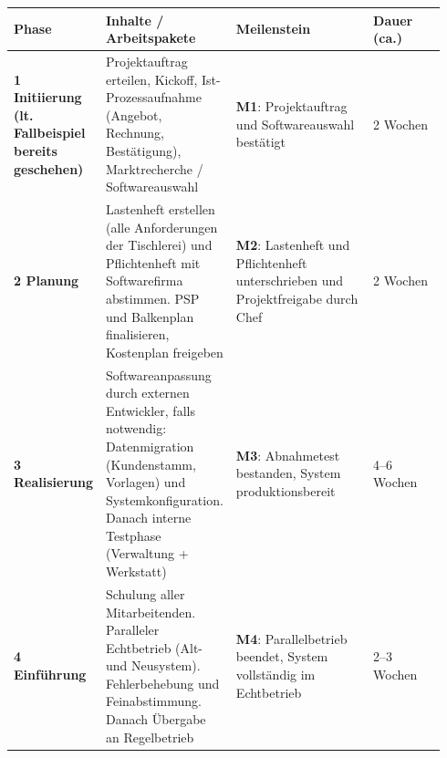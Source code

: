 \documentclass[
    a4paper,
    11pt,
    bibliography=totoc,
    listof=totoc,
    parskip=half,
    headings=normal
]{scrbook}
\begin{document}
\begin{longtable}{@{}p{0.15\linewidth}p{0.30\linewidth}p{0.32\linewidth}p{0.17\linewidth}@{}}
      \toprule
      \textbf{Phase} & \textbf{Inhalte / Arbeitspakete}                                                                                                                                                & \textbf{Meilenstein} & \textbf{Dauer (ca.)} \\
      \midrule
      \endhead
      \textbf{1 Initiierung (lt. Fallbeispiel bereits geschehen)}
                     & Projektauftrag erteilen, Kickoff, Ist-Prozessaufnahme (Angebot, Rechnung, Bestätigung), Marktrecherche / Softwareauswahl
                     & \textbf{M1}: Projektauftrag und Softwareauswahl bestätigt
                     & 2 Wochen                                                                                                                                                                                                                      \\
      \midrule
      \textbf{2 Planung}
                     & Lastenheft erstellen (alle Anforderungen der Tischlerei) und Pflichtenheft mit Softwarefirma abstimmen. PSP und Balkenplan finalisieren, Kostenplan freigeben
                     & \textbf{M2}: Lastenheft und Pflichtenheft unterschrieben und Projektfreigabe durch Chef
                     & 2 Wochen                                                                                                                                                                                                                      \\
      \midrule
      \textbf{3 Realisierung}
                     & Softwareanpassung durch externen Entwickler, falls notwendig: Datenmigration (Kundenstamm, Vorlagen) und Systemkonfiguration. Danach interne Testphase (Verwaltung + Werkstatt)
                     & \textbf{M3}: Abnahmetest bestanden, System produktionsbereit
                     & 4--6 Wochen                                                                                                                                                                                                                   \\
      \midrule
      \textbf{4 Einführung}
                     & Schulung aller Mitarbeitenden. Paralleler Echtbetrieb (Alt- und Neusystem). Fehlerbehebung und Feinabstimmung. Danach Übergabe an Regelbetrieb
                     & \textbf{M4}: Parallelbetrieb beendet, System vollständig im Echtbetrieb
                     & 2--3 Wochen                                                                                                                                                                                                                   \\

\end{longtable}
\end{document}
